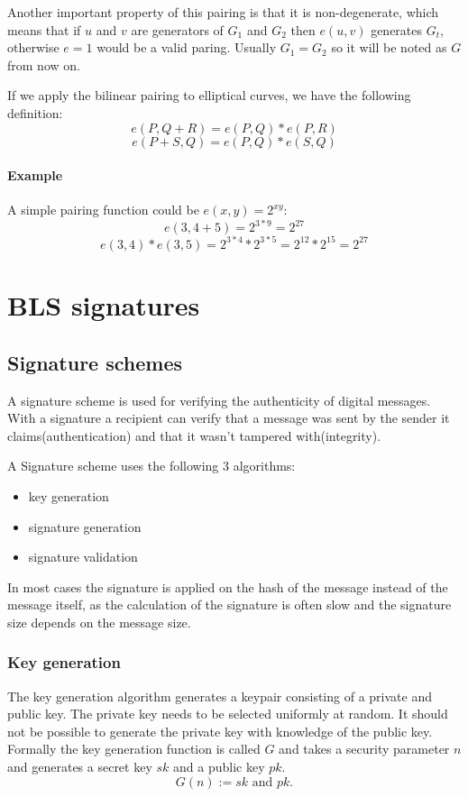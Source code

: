 \documentclass[a4paper,12pt]{scrartcl}
\begin{document}
Another important property of this pairing is that it is non-degenerate, which means that if $u$ and $v$ are generators of $G_1$ and $G_2$ then $e(u,v)$ generates $G_t$, otherwise $e = 1$ would be a valid paring.
Usually $G_1 = G_2$ so it will be noted as $G$ from now on.

If we apply the bilinear pairing to elliptical curves, we have the following definition:
$$e(P, Q + R) = e(P, Q) * e(P, R)$$
$$e(P + S, Q) = e(P, Q) * e(S, Q)$$

\paragraph{Example}
A simple pairing function could be $e(x, y) = 2^{xy}$:
$$e(3, 4 + 5) = 2^{3*9} = 2^{27}$$
$$e(3, 4) * e(3, 5) = 2^{3*4} * 2^{3*5} = 2^{12} * 2^{15} = 2^{27}$$

\pagebreak

\section{BLS signatures}
\subsection{Signature schemes}

A signature scheme is used for verifying the authenticity of digital messages. With a signature a recipient can verify that a message was sent by the sender it claims(authentication) and that it wasn't tampered with(integrity).

A Signature scheme uses the following 3 algorithms:
\begin{itemize}
	\item key generation
	\item signature generation
	\item signature validation
\end{itemize}

In most cases the signature is applied on the hash of the message instead of the message itself, as the calculation of the signature is often slow and the signature size depends on the message size. 

\subsubsection{Key generation}

The key generation algorithm generates a keypair consisting of a private and public key. The private key needs to be selected uniformly at random. It should not be possible to generate the private key with knowledge of the public key. Formally the key generation function is called $G$ and takes a security parameter $n$ and generates a secret key $sk$ and a public key $pk$.
\[
G(n) := sk \text{ and } pk.
\]
\end{document}
